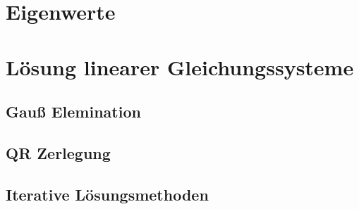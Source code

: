 


\chapter{Eigenwerte}



\chapter{Lösung linearer Gleichungssysteme}

\section{Gauß Elemination}

\section{QR Zerlegung}

\section{Iterative Lösungsmethoden}




